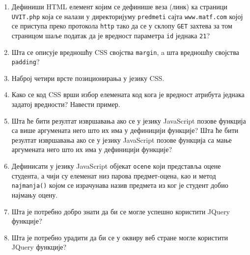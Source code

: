 \documentclass[a4paper]{article}
\begin{document}
\begin{enumerate}
\hrulefill

\hrulefill

\hrulefill


\item Дефиниши HTML елемент којим се дефинише веза (линк) ка страници \verb|UVIT.php| која се налази у директоријуму \verb|predmeti|
сајта \verb|www.matf.com| којој се приступа преко протокола \verb|http| тако да се у склопу \verb|GET| захтева за том страницом шаље 
податак да је вредност параметра \verb|id| једнака \verb|21|? \hrulefill

\hrulefill


\item Шта се описује вредношћу CSS својства \verb|margin|, a шта вредношћу својства \verb|padding|? \hrulefill

\hrulefill 


\item Наброј четири врсте позиционирања у језику CSS. \hrulefill

\hrulefill 


\item Како се код CSS врши избор елемената код кога је вредност атрибута једнака задатој вредности? Навести пример. \hrulefill

\hrulefill

\hrulefill


\item Шта ће бити резултат извршавања ако се у језику JavaScript позове функција са више аргумената 
него што их има у дефиницији функције? Шта ће бити резултат извршавања ако се у језику JavaScript 
позове функција са мање аргумената него што их има у дефиницији функције?  \hrulefill

\hrulefill


\item Дефинисати у језику JavaScript објекат \verb|ocene| који представља
  оцене студента, а чији су елеменат низ парова предмет-оцена, као и метод \verb|najmanja()| којом се 
	израчунава назив предмета из ког је студент добио најмању оцену.  \hrulefill

\hrulefill

\hrulefill

\hrulefill

\item Шта је потребно добро знати да би се могле успешно користити JQuery функције? \hrulefill

\hrulefill

\item Шта је потребно урадити да би се у оквиру веб стране могле користити JQuery функције? \hrulefill


\end{enumerate}
\end{document}
